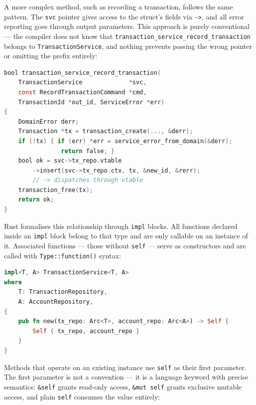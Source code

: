 A more complex method, such as recording a transaction, follows the same
pattern. The \texttt{svc} pointer gives access to the struct's fields via
\texttt{->}, and all error reporting goes through output parameters.
This approach is purely conventional --- the compiler does not know that
\texttt{transaction\_service\_record\_transaction} belongs to
\texttt{TransactionService}, and nothing prevents passing the wrong pointer
or omitting the prefix entirely:

\noindent\begin{minipage}{\linewidth}
\begin{lstlisting}[language=C, caption={transaction\_service.c --- A method
with business logic. The naming convention \texttt{transaction\_service\_*}
is the only thing binding this function to its type.}]
bool transaction_service_record_transaction(
    TransactionService             *svc,
    const RecordTransactionCommand *cmd,
    TransactionId *out_id, ServiceError *err)
{
    DomainError derr;
    Transaction *tx = transaction_create(..., &derr);
    if (!tx) { if (err) *err = service_error_from_domain(&derr);
                return false; }
    bool ok = svc->tx_repo.vtable
        ->insert(svc->tx_repo.ctx, tx, &new_id, &rerr);
        // -> dispatches through vtable
    transaction_free(tx);
    return ok;
}
\end{lstlisting}\end{minipage}

Rust formalises this relationship through \texttt{impl} blocks. All
functions declared inside an \texttt{impl} block belong to that type and
are only callable on an instance of it. Associated functions --- those
without \texttt{self} --- serve as constructors and are called with
\texttt{Type::function()} syntax:

\begin{lstlisting}[language=Rust, caption={transaction.rs (service) ---
\texttt{new} is an associated function: it belongs to the type's namespace
but does not require an existing instance. This is the idiomatic constructor
pattern in Rust.}]
impl<T, A> TransactionService<T, A>
where
    T: TransactionRepository,
    A: AccountRepository,
{
    pub fn new(tx_repo: Arc<T>, account_repo: Arc<A>) -> Self {
        Self { tx_repo, account_repo }
    }
}
\end{lstlisting}

Methods that operate on an existing instance use \texttt{self} as their
first parameter. The first parameter is not a convention --- it is a
language keyword with precise semantics: \texttt{\&self} grants read-only
access, \texttt{\&mut self} grants exclusive mutable access, and plain
\texttt{self} consumes the value entirely:

